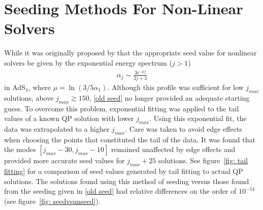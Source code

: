 \documentclass[letterpaper,11pt]{article}
\begin{document}
\section{Seeding Methods For Non-Linear Solvers}
\label{app: seeding}
While it was originally proposed by \cite{1507.08261} that the appropriate seed value for nonlinear solvers be given by the exponential energy spectrum ($j > 1$)
\begin{align}
\label{old seed}
\alpha_j \sim \frac{3 e^{-\mu j}}{2j + 3}
\end{align}
in AdS$_4$, where $\mu = \ln (3 / 5 \alpha_1 )$. Although this profile was sufficient for low $j_{max}$ solutions, above $j_{max} \gtrsim 150$, \eqref{old seed} no longer provided an adequate starting guess. To overcome this problem, exponential fitting was applied to the tail values of a known QP solution with lower $j_{max}$. Using this exponential fit, the data was extrapolated to a higher $j_{max}$. Care was taken to avoid edge effects when choosing the points that constituted the tail of the data. It was found that the modes $[ j_{max} - 30, j_{max} - 10]$ remained unaffected by edge effects and provided more accurate seed values for $j_{max} + 25$ solutions. See figure~\ref{fig: tail fitting} for a comparison of seed values generated by tail fitting to actual QP solutions. The solutions found using this method of seeding versus those found from the seeding given in \eqref{old seed} had relative differences on the order of $10^{-14}$ (see figure~\ref{fig: seedvsunseed}).
\end{document}
